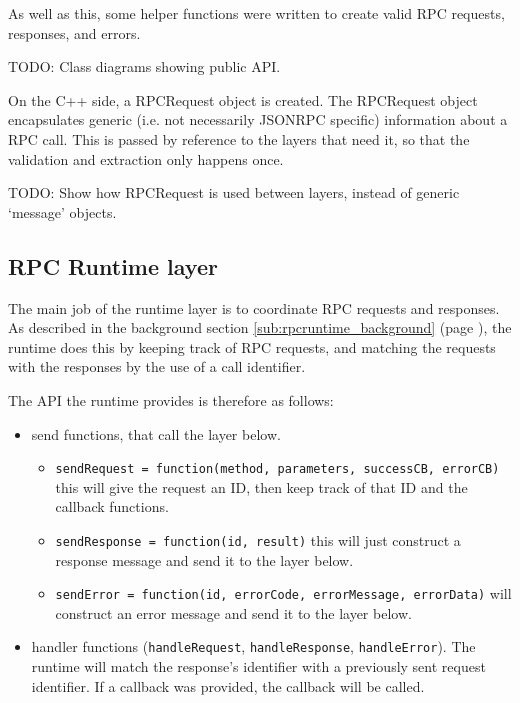 As well as this, some helper functions were written to create valid RPC requests, responses, and errors.

TODO: Class diagrams showing public API.

On the C++ side, a RPCRequest object is created. The RPCRequest object encapsulates generic (i.e. not necessarily JSONRPC specific) information about a RPC call. This is passed by reference to the layers that need it, so that the validation and extraction only happens once.

TODO: Show how RPCRequest is used between layers, instead of generic `message' objects.



\subsection{RPC Runtime layer} %
\label{sub:rpc_runtime_layer_design}
The main job of the runtime layer is to coordinate RPC requests and responses. As described in the background section \ref{sub:rpcruntime_background} (page \pageref{sub:rpcruntime_background}), the runtime does this by keeping track of RPC requests, and matching the requests with the responses by the use of a call identifier.

The API the runtime provides is therefore as follows:
\begin{itemize}
	\item send functions, that call the layer below.
	\begin{itemize}
		\item \lstinline+sendRequest = function(method, parameters, successCB, errorCB)+ this will give the request an ID, then keep track of that ID and the callback functions.
		\item \lstinline+sendResponse = function(id, result)+ this will just construct a response message and send it to the layer below.
		\item \lstinline+sendError = function(id, errorCode, errorMessage, errorData)+ will construct an error message and send it to the layer below.
	\end{itemize}
	\item handler functions (\lstinline+handleRequest+, \lstinline+handleResponse+, \lstinline+handleError+). The runtime will match the response's identifier with a previously sent request identifier. If a callback was provided, the callback will be called.
\end{itemize}

